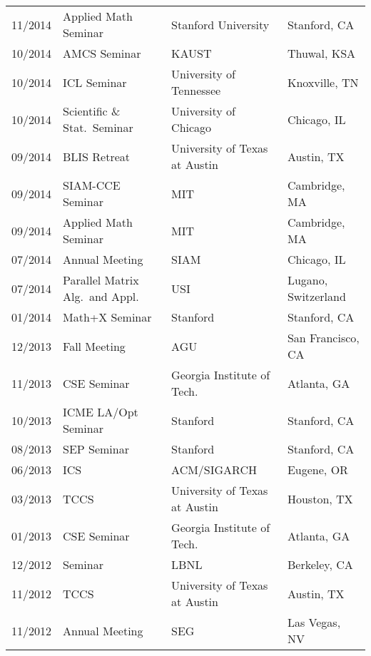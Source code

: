 \documentclass[letterpaper]{article}
\begin{document}
\begin{tabular}{rlll}
11/2014 & Applied Math Seminar            & Stanford University           & Stanford, CA \\
10/2014 & AMCS Seminar                    & KAUST                         & Thuwal, KSA \\
10/2014 & ICL Seminar                     & University of Tennessee       & Knoxville, TN \\
10/2014 & Scientific \& Stat.\ Seminar    & University of Chicago         & Chicago, IL \\
09/2014 & BLIS Retreat                    & University of Texas at Austin & Austin, TX \\
09/2014 & SIAM-CCE Seminar                & MIT                           & Cambridge, MA \\
09/2014 & Applied Math Seminar            & MIT                           & Cambridge, MA \\
07/2014 & Annual Meeting                  & SIAM                          & Chicago, IL \\
07/2014 & Parallel Matrix Alg.\ and Appl. & USI                           & Lugano, Switzerland \\
01/2014 & Math+X Seminar                  & Stanford                      & Stanford, CA \\
12/2013 & Fall Meeting                    & AGU                           & San Francisco, CA \\
11/2013 & CSE Seminar                     & Georgia Institute of Tech.\   & Atlanta, GA \\
10/2013 & ICME LA/Opt Seminar             & Stanford                      & Stanford, CA \\
08/2013 & SEP Seminar                     & Stanford                      & Stanford, CA \\
06/2013 & ICS                             & ACM/SIGARCH                   & Eugene, OR \\
03/2013 & TCCS                            & University of Texas at Austin & Houston, TX \\
01/2013 & CSE Seminar                     & Georgia Institute of Tech.\   &  Atlanta, GA \\
12/2012 & Seminar                         & LBNL                          &  Berkeley, CA \\
11/2012 & TCCS                            & University of Texas at Austin & Austin, TX \\
11/2012 & Annual Meeting                  & SEG                           & Las Vegas, NV \\

\end{tabular}
\end{document}
